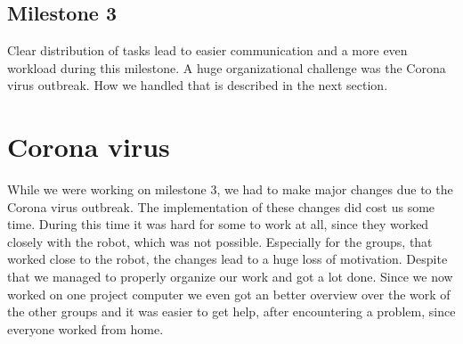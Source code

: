 \documentclass[main.tex]{subfiles}
\begin{document}
		\subsection{Milestone 3}
		Clear distribution of tasks lead to easier communication and a more even workload during this milestone.
		A huge organizational challenge was the Corona virus outbreak. How we handled that is described in the next section. 
		
		\section{Corona virus}
	  	While we were working on milestone 3, we had to make major changes due to the Corona virus outbreak. The implementation of these changes did cost us some time. During this time it was hard for some to work at all, since they worked closely with the robot, which was not possible.
	  	Especially for the groups, that worked close to the robot, the changes lead to a huge loss of motivation.
	  	Despite that we managed to properly organize our work and got a lot done.
	  	Since we now worked on one project computer we even got an better overview over the work of the other groups and it was easier to get help, after encountering a problem, since everyone worked from home.

	\endgroup
\end{document}
